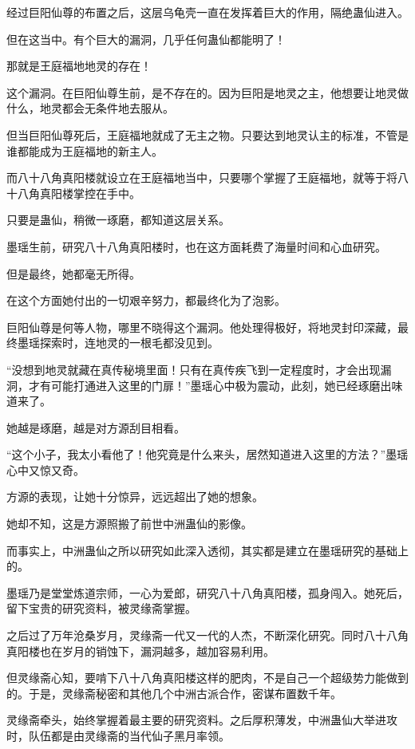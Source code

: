 \begin{this_body}
经过巨阳仙尊的布置之后，这层乌龟壳一直在发挥着巨大的作用，隔绝蛊仙进入。

但在这当中。有个巨大的漏洞，几乎任何蛊仙都能明了！

那就是王庭福地地灵的存在！

这个漏洞。在巨阳仙尊生前，是不存在的。因为巨阳是地灵之主，他想要让地灵做什么，地灵都会无条件地去服从。

但当巨阳仙尊死后，王庭福地就成了无主之物。只要达到地灵认主的标准，不管是谁都能成为王庭福地的新主人。

而八十八角真阳楼就设立在王庭福地当中，只要哪个掌握了王庭福地，就等于将八十八角真阳楼掌控在手中。

只要是蛊仙，稍微一琢磨，都知道这层关系。

墨瑶生前，研究八十八角真阳楼时，也在这方面耗费了海量时间和心血研究。

但是最终，她都毫无所得。

在这个方面她付出的一切艰辛努力，都最终化为了泡影。

巨阳仙尊是何等人物，哪里不晓得这个漏洞。他处理得极好，将地灵封印深藏，最终墨瑶探索时，连地灵的一根毛都没见到。

“没想到地灵就藏在真传秘境里面！只有在真传疾飞到一定程度时，才会出现漏洞，才有可能打通进入这里的门扉！”墨瑶心中极为震动，此刻，她已经琢磨出味道来了。

她越是琢磨，越是对方源刮目相看。

“这个小子，我太小看他了！他究竟是什么来头，居然知道进入这里的方法？”墨瑶心中又惊又奇。

方源的表现，让她十分惊异，远远超出了她的想象。

她却不知，这是方源照搬了前世中洲蛊仙的影像。

而事实上，中洲蛊仙之所以研究如此深入透彻，其实都是建立在墨瑶研究的基础上的。

墨瑶乃是堂堂炼道宗师，一心为爱郎，研究八十八角真阳楼，孤身闯入。她死后，留下宝贵的研究资料，被灵缘斋掌握。

之后过了万年沧桑岁月，灵缘斋一代又一代的人杰，不断深化研究。同时八十八角真阳楼也在岁月的销蚀下，漏洞越多，越加容易利用。

但灵缘斋心知，要啃下八十八角真阳楼这样的肥肉，不是自己一个超级势力能做到的。于是，灵缘斋秘密和其他几个中洲古派合作，密谋布置数千年。

灵缘斋牵头，始终掌握着最主要的研究资料。之后厚积薄发，中洲蛊仙大举进攻时，队伍都是由灵缘斋的当代仙子黑月率领。


\end{this_body}
